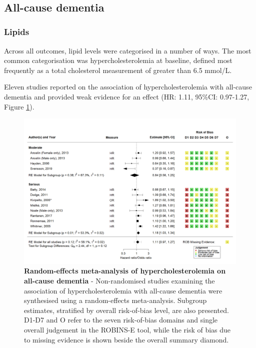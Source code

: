 \documentclass[a4paper, twoside]{templates/ociamthesis}
\begin{document}
~

\hypertarget{sys-rev-res-Dementia}{%
\subsection{All-cause dementia}\label{sys-rev-res-Dementia}}

\hypertarget{lipids}{%
\subsubsection{Lipids}\label{lipids}}

Across all outcomes, lipid levels were categorised in a number of ways. The most common categorisation was hypercholesterolemia at baseline, defined most frequently as a total cholesterol measurement of greater than 6.5 mmol/L.

Eleven studies reported on the association of hypercholesterolemia with all-cause dementia and provided weak evidence for an effect (HR: 1.11, 95\%CI: 0.97-1.27, Figure \ref{fig:obsHyperDementia}).





\begin{figure}[H]
\includegraphics[width=1\linewidth]{figures/sys-rev/fp_obs_hyperchol_Dementia} \caption[Random-effects meta-analysis of hypercholesterolemia on all-cause dementia]{\textbf{Random-effects meta-analysis of hypercholesterolemia on all-cause dementia} - Non-randomised studies examining the association of hypercholesterolemia with all-cause dementia were synthesised using a random-effects meta-analysis. Subgroup estimates, stratified by overall risk-of-bias level, are also presented. D1-D7 and O refer to the seven risk-of-bias domains and single overall judgement in the ROBINS-E tool, while the risk of bias due to missing evidence is shown beside the overall summary diamond.}\label{fig:obsHyperDementia}
\end{figure}
\end{document}
